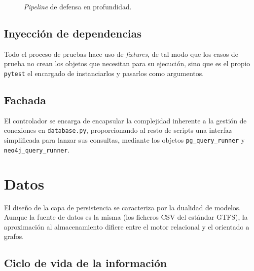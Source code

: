 \begin{figure}[ht]
    \caption{\textit{Pipeline} de defensa en profundidad.}
    \label{design:layered_defense}
\end{figure}

\subsection{Inyección de dependencias}

Todo el proceso de pruebas hace uso de \textit{fixtures}, de tal modo que los casos de prueba no crean los objetos que necesitan para su ejecución, sino que es el propio \texttt{pytest} el encargado de instanciarlos y pasarlos como argumentos.

\subsection{Fachada}

El controlador se encarga de encapsular la complejidad inherente a la gestión de conexiones en \texttt{database.py}, proporcionando al resto de scripts una interfaz simplificada para lanzar sus consultas, mediante los objetos \texttt{pg\_query\_runner} y \texttt{neo4j\_query\_runner}.

\section{Datos}

El diseño de la capa de persistencia se caracteriza por la dualidad de modelos. Aunque la fuente de datos es la misma (los ficheros CSV del estándar GTFS), la aproximación al almacenamiento difiere entre el motor relacional y el orientado a grafos.

\subsection{Ciclo de vida de la información}

